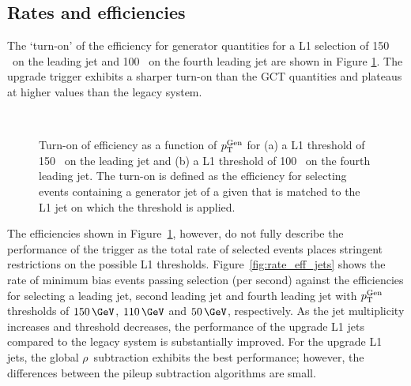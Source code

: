 \subsection{Rates and efficiencies}

The `turn-on' of the efficiency for generator quantities for a L1 selection of 150 \GeV~on the leading jet
and 100 \GeV~on the fourth leading jet are shown in Figure \ref{fig:turnon}. The upgrade trigger exhibits a sharper turn-on
than the GCT quantities and plateaus at higher values than the legacy system. 

\begin{figure}
    \begin{center} 
	~
	\caption{Turn-on of efficiency as a function of ${p_{\text T}^{\text{Gen}}}$ for (a) a L1 threshold of 150 \GeV~on the leading jet and (b) 
	a L1 threshold of 100 \GeV~on the fourth leading jet. The turn-on is defined as the efficiency for selecting events containing
	a generator jet of a given \pt that is matched to the L1 jet on which the threshold is applied.}
	    \label{fig:turnon}
    \end{center} 
\end{figure}

The efficiencies shown in Figure~\ref{fig:turnon}, however, do not fully describe the performance 
of the trigger as the total rate of selected events places 
stringent restrictions on the possible L1 thresholds. Figure~\ref{fig:rate_eff_jets} shows the rate of 
minimum bias events passing selection (per second) against the efficiencies for selecting 
a leading jet, second leading jet and fourth leading jet with ${p_{\text T}^{\text{Gen}}}$ thresholds of $150\,\GeV$,
$110\,\GeV$ and $50\,\GeV$, respectively. As the jet multiplicity increases and threshold decreases,
the performance of the upgrade L1 jets compared to the legacy system is substantially improved.
For the upgrade L1 jets, the global $\rho$~subtraction exhibits the best performance; however, the differences 
between the pileup subtraction algorithms are small.

